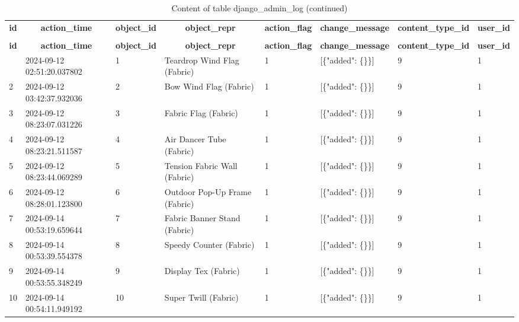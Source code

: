 %
%
 \begin{longtable}{|l|l|l|l|l|l|l|l|} 
 \hline \endhead \hline \endfoot \hline 
 \caption{Content of table django\_admin\_log} \label{tab:django_admin_log-data} \\\hline \multicolumn{1}{|c|}{\textbf{id}} & \multicolumn{1}{|c|}{\textbf{action\_time}} & \multicolumn{1}{|c|}{\textbf{object\_id}} & \multicolumn{1}{|c|}{\textbf{object\_repr}} & \multicolumn{1}{|c|}{\textbf{action\_flag}} & \multicolumn{1}{|c|}{\textbf{change\_message}} & \multicolumn{1}{|c|}{\textbf{content\_type\_id}} & \multicolumn{1}{|c|}{\textbf{user\_id}} \\ \hline \hline  \endfirsthead 
\caption{Content of table django\_admin\_log (continued)} \\ \hline \multicolumn{1}{|c|}{\textbf{id}} & \multicolumn{1}{|c|}{\textbf{action\_time}} & \multicolumn{1}{|c|}{\textbf{object\_id}} & \multicolumn{1}{|c|}{\textbf{object\_repr}} & \multicolumn{1}{|c|}{\textbf{action\_flag}} & \multicolumn{1}{|c|}{\textbf{change\_message}} & \multicolumn{1}{|c|}{\textbf{content\_type\_id}} & \multicolumn{1}{|c|}{\textbf{user\_id}} \\ \hline \hline \endhead \endfoot
1 & 2024-09-12 02:51:20.037802 & 1 & Teardrop Wind Flag (Fabric) & 1 & [\{"added": \{\}\}] & 9 & 1 \\ \hline 
2 & 2024-09-12 03:42:37.932036 & 2 & Bow Wind Flag (Fabric) & 1 & [\{"added": \{\}\}] & 9 & 1 \\ \hline 
3 & 2024-09-12 08:23:07.031226 & 3 & Fabric Flag (Fabric) & 1 & [\{"added": \{\}\}] & 9 & 1 \\ \hline 
4 & 2024-09-12 08:23:21.511587 & 4 & Air Dancer Tube (Fabric) & 1 & [\{"added": \{\}\}] & 9 & 1 \\ \hline 
5 & 2024-09-12 08:23:44.069289 & 5 & Tension Fabric Wall (Fabric) & 1 & [\{"added": \{\}\}] & 9 & 1 \\ \hline 
6 & 2024-09-12 08:28:01.123800 & 6 & Outdoor Pop-Up Frame (Fabric) & 1 & [\{"added": \{\}\}] & 9 & 1 \\ \hline 
7 & 2024-09-14 00:53:19.659644 & 7 & Fabric Banner Stand (Fabric) & 1 & [\{"added": \{\}\}] & 9 & 1 \\ \hline 
8 & 2024-09-14 00:53:39.554378 & 8 & Speedy Counter (Fabric) & 1 & [\{"added": \{\}\}] & 9 & 1 \\ \hline 
9 & 2024-09-14 00:53:55.348249 & 9 & Display Tex (Fabric) & 1 & [\{"added": \{\}\}] & 9 & 1 \\ \hline 
10 & 2024-09-14 00:54:11.949192 & 10 & Super Twill (Fabric) & 1 & [\{"added": \{\}\}] & 9 & 1 \\ \hline 

\end{longtable}
